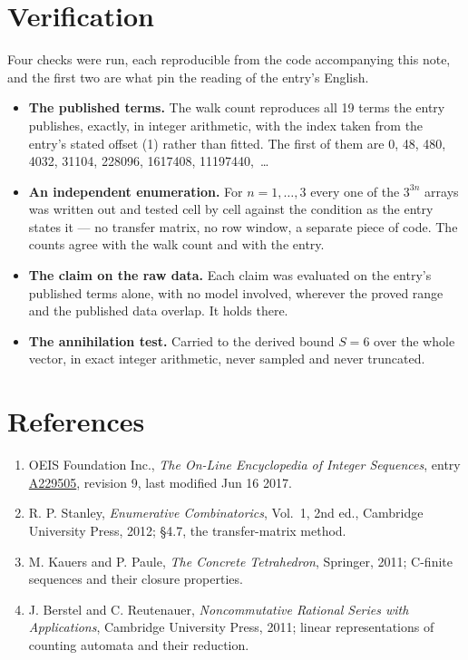 \documentclass[11pt]{article}
\theoremstyle{definition}
\begin{document}
\section{Verification}

Four checks were run, each reproducible from the code accompanying this note, and the first two are what pin the reading of the entry's English.

\begin{itemize}

\item {\bfseries The published terms.} The walk count reproduces all 19 terms the entry publishes, exactly, in integer arithmetic, with the index taken from the entry's stated offset (1) rather than fitted. The first of them are 0, 48, 480, 4032, 31104, 228096, 1617408, 11197440,~\dots

\item {\bfseries An independent enumeration.} For $n = 1,\dots,3$ every one of the $3^{3n}$ arrays was written out and tested cell by cell against the condition as the entry states it --- no transfer matrix, no row window, a separate piece of code. The counts agree with the walk count and with the entry.

\item {\bfseries The claim on the raw data.} Each claim was evaluated on the entry's published terms alone, with no model involved, wherever the proved range and the published data overlap. It holds there.

\item {\bfseries The annihilation test.} Carried to the derived bound $S = 6$ over the whole vector, in exact integer arithmetic, never sampled and never truncated.

\end{itemize}

\section{References}

\begin{enumerate}

\item OEIS Foundation Inc., \emph{The On-Line Encyclopedia of Integer Sequences}, entry \href{https://oeis.org/A229505}{A229505}, revision 9, last modified Jun 16 2017.

\item R. P. Stanley, \emph{Enumerative Combinatorics}, Vol.~1, 2nd ed., Cambridge University Press, 2012; \S4.7, the transfer-matrix method.

\item M. Kauers and P. Paule, \emph{The Concrete Tetrahedron}, Springer, 2011; C-finite sequences and their closure properties.

\item J. Berstel and C. Reutenauer, \emph{Noncommutative Rational Series with Applications}, Cambridge University Press, 2011; linear representations of counting automata and their reduction.

\end{enumerate}
\end{document}
